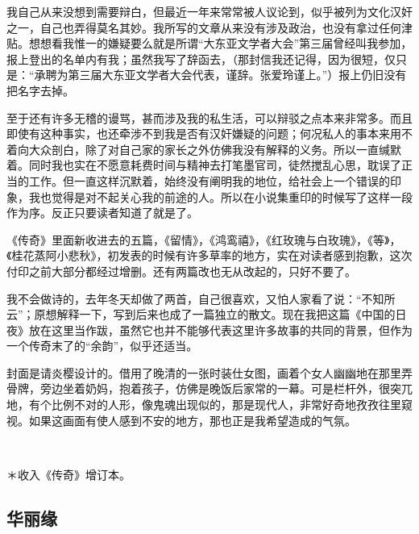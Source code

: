 \par 我自己从来没想到需要辩白，但最近一年来常常被人议论到，似乎被列为文化汉奸之一，自己也弄得莫名其妙。我所写的文章从来没有涉及政治，也没有拿过任何津贴。想想看我惟一的嫌疑要么就是所谓“大东亚文学者大会”第三届曾经叫我参加，报上登出的名单内有我；虽然我写了辞函去，（那封信我还记得，因为很短，仅只是：“承聘为第三届大东亚文学者大会代表，谨辞。张爱玲谨上。”）报上仍旧没有把名字去掉。
\par 至于还有许多无稽的谩骂，甚而涉及我的私生活，可以辩驳之点本来非常多。而且即使有这种事实，也还牵涉不到我是否有汉奸嫌疑的问题；何况私人的事本来用不着向大众剖白，除了对自己家的家长之外仿佛我没有解释的义务。所以一直缄默着。同时我也实在不愿意耗费时间与精神去打笔墨官司，徒然搅乱心思，耽误了正当的工作。但一直这样沉默着，始终没有阐明我的地位，给社会上一个错误的印象，我也觉得是对不起关心我的前途的人。所以在小说集重印的时候写了这样一段作为序。反正只要读者知道了就是了。
\par 《传奇》里面新收进去的五篇，《留情》，《鸿鸾禧》，《红玫瑰与白玫瑰》，《等》，《桂花蒸阿小悲秋》，初发表的时候有许多草率的地方，实在对读者感到抱歉，这次付印之前大部分都经过增删。还有两篇改也无从改起的，只好不要了。
\par 我不会做诗的，去年冬天却做了两首，自己很喜欢，又怕人家看了说：“不知所云”；原想解释一下，写到后来也成了一篇独立的散文。现在我把这篇《中国的日夜》放在这里当作跋，虽然它也并不能够代表这里许多故事的共同的背景，但作为一个传奇末了的“余韵”，似乎还适当。
\par 封面是请炎樱设计的。借用了晚清的一张时装仕女图，画着个女人幽幽地在那里弄骨牌，旁边坐着奶妈，抱着孩子，仿佛是晚饭后家常的一幕。可是栏杆外，很突兀地，有个比例不对的人形，像鬼魂出现似的，那是现代人，非常好奇地孜孜往里窥视。如果这画面有使人感到不安的地方，那也正是我希望造成的气氛。
\par  
\par ＊收入《传奇》增订本。


\subsection{华丽缘}

